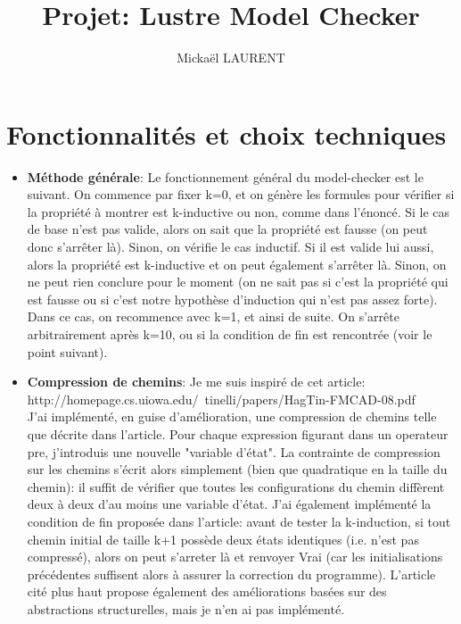\documentclass[a4paper]{article}%
\title{\vspace{1.5cm}Projet: Lustre Model Checker}
\author{Mickaël LAURENT}
\date{\vspace{-5ex}}
\begin{document}
    \maketitle

    \section{Fonctionnalités et choix techniques}
		
	\begin{itemize}
		\item \textbf{Méthode générale}: Le fonctionnement général du model-checker est le suivant.
		On commence par fixer k=0, et on génère les formules pour vérifier si la propriété à montrer est k-inductive ou non, comme dans l'énoncé.
		Si le cas de base n'est pas valide, alors on sait que la propriété est fausse (on peut donc s'arrêter là). Sinon, on vérifie le cas inductif.
		Si il est valide lui aussi, alors la propriété est k-inductive et on peut également s'arrêter là. Sinon, on ne peut rien conclure pour le moment
		(on ne sait pas si c'est la propriété qui est fausse ou si c'est notre hypothèse d'induction qui n'est pas assez forte). Dans ce cas, on recommence avec k=1, et ainsi de suite.
		On s'arrête arbitrairement après k=10, ou si la condition de fin est rencontrée (voir le point suivant).\\
		\item \textbf{Compression de chemins}: Je me suis inspiré de cet article:\\http://homepage.cs.uiowa.edu/~tinelli/papers/HagTin-FMCAD-08.pdf\\
		J'ai implémenté, en guise d'amélioration, une compression de chemins telle que décrite dans l'article.
		Pour chaque expression figurant dans un operateur pre, j'introduis une nouvelle "variable d'état".
		La contrainte de compression sur les chemins s'écrit alors simplement (bien que quadratique en la taille du chemin):
		il suffit de vérifier que toutes les configurations du chemin diffèrent deux à deux d'au moins une variable d'état.
		J'ai également implémenté la condition de fin proposée dans l'article: avant de tester la k-induction, si tout chemin initial de taille k+1 possède deux états identiques (i.e. n'est pas compressé),
		alors on peut s'arreter là et renvoyer Vrai (car les initialisations précédentes suffisent alors à assurer la correction du programme).
		L'article cité plus haut propose également des améliorations basées sur des abstractions structurelles, mais je n'en ai pas implémenté.\\

\end{itemize}
\end{document}
